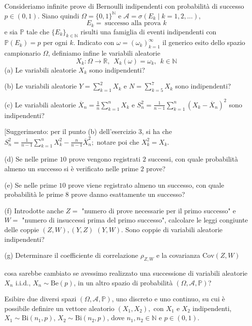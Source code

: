 Consideriamo infinite prove di Bernoulli indipendenti con probabilità di successo $p\in (0,1)$. Siano quindi $\Omega =\{0,1\}^{\mathbb{N}}$ e $\mathcal{A} =\sigma ( E_{k} \mid k=1,2,\dotsc )$,
\begin{equation*}
E_{k} =\ \text{successo alla prova } k
\end{equation*}
e sia $\mathbb{P}$ tale che $\{E_{k}\}_{k\in \mathbb{N}}$ risulti una famiglia di eventi indipendenti con $\mathbb{P}( E_{k}) =p$ per ogni $k$. Indicato con $\omega =( \omega _{k})_{k=1}^{\infty }$ il generico esito dello spazio campionario $\Omega $, definiamo infine le variabili aleatorie
\begin{equation*}
X_{k} :\Omega \rightarrow \mathbb{R} ,\ \ X_{k} (\omega )=\omega _{k} ,\ \ k\in \mathbb{N}
\end{equation*}
(a) Le variabili aleatorie $X_{k}$ sono indipendenti?

(b) Le variabili aleatorie $Y=\sum _{k=1}^{2} X_{k}$ e $N=\sum _{k=5}^{7} X_{k}$ sono indipendenti?

(c) Le variabili aleatorie $\overline{X}_{n} =\frac{1}{n}\sum _{k=1}^{n} X_{k}$ e $S_{n}^{2} =\frac{1}{n-1}\sum _{k=1}^{n}( X_{k} -\overline{X}_{n})^{2}$ sono indipendenti?

[Suggerimento: per il punto (b) dell'esercizio 3, si ha che $S_{n}^{2} =\frac{1}{n-1}\sum _{k=1}^{n} X_{k}^{2} -\frac{n}{n-1}\overline{X}_{n}^{2} ;$ notare poi che $X_{k}^{2} =X_{k}$.

(d) Se nelle prime $10$ prove vengono registrati $2$ successi, con quale probabilità almeno un successo si è verificato nelle prime $2$ prove?

(e) Se nelle prime $10$ prove viene registrato almeno un successo, con quale probabilità le prime $8$ prove danno esattamente un successo?

(f) Introdotte anche $Z=$ "numero di prove necessarie per il primo successo" e $W=$ "numero di insuccessi prima del primo successo", calcolare le leggi congiunte delle coppie $(Z,W),(Y,Z)$ $(Y,W).$ Sono coppie di variabili aleatorie indipendenti?

(g) Determinare il coefficiente di correlazione $\rho _{Z,W}$ e la covarianza $\mathrm{Cov} (Z,W)$

cosa sarebbe cambiato se avessimo realizzato una successione di variabili aleatorie $X_{n}$ i.i.d., $X_{n} \sim \mathrm{Be} (p)$, in un altro spazio di probabilità $(\Omega ,\mathcal{A} ,\mathbb{P} )$?
\Esercizio{}

Esibire due diversi spazi $(\Omega ,\mathcal{A} ,\mathbb{P} )$, uno discreto e uno continuo, su cui è possibile definire un vettore aleatorio $( X_{1} ,X_{2}) ,$ con $X_{1}$ e $X_{2}$ indipendenti, $X_{1} \sim \mathrm{Bi}( n_{1} ,p)$, $X_{2} \sim \mathrm{Bi}( n_{2} ,p)$, dove $n_{1} ,n_{2} \in \mathbb{N}$ e $p\in (0,1)$.
\Esercizio{}


